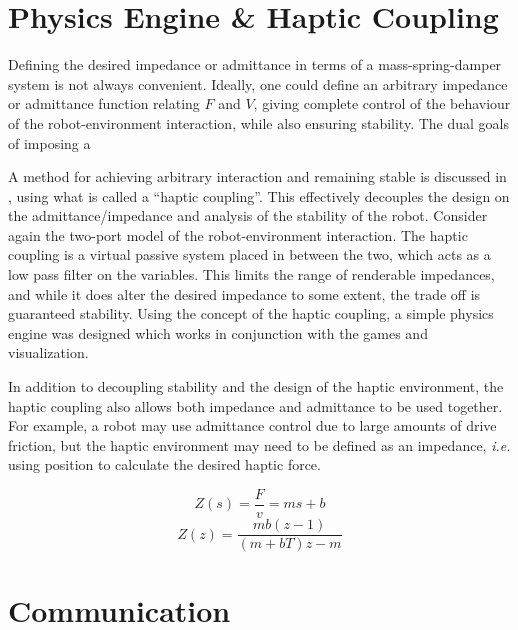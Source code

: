 \documentclass[12pt]{report}
\begin{document}
	

	\section{Physics Engine \& Haptic Coupling}
%

Defining the desired impedance or admittance in terms of a mass-spring-damper system is not always convenient. Ideally, one could define an arbitrary impedance or admittance function relating $F$ and $V$, giving complete control of the behaviour of the robot-environment interaction, while also ensuring stability. The dual goals of imposing a 
	
	A method for achieving arbitrary interaction and remaining stable is discussed in \cite{Adams1999}, using what is called a ``haptic coupling''. This effectively decouples the design on the admittance/impedance and analysis of the stability of the robot. Consider again the two-port model of the robot-environment interaction. The haptic coupling is a virtual passive system placed in between the two, which acts as a low pass filter on the variables. This limits the range of renderable impedances, and while it does alter the desired impedance to some extent, the trade off is guaranteed stability. Using the concept of the haptic coupling, a simple physics engine was designed which works in conjunction with the games and visualization. 
	
	In addition to decoupling stability and the design of the haptic environment, the haptic coupling also allows both impedance and admittance to be used together. For example, a robot may use admittance control due to large amounts of drive friction, but the haptic environment may need to be defined as an impedance, \textit{i.e.} using position to calculate the desired haptic force. 
	
	\begin{equation}
		Z(s) = \frac{F}{v} = ms + b  
	\end{equation}
	\begin{equation}
		Z(z) = \frac{mb(z-1)}{(m+bT)z - m}
	\end{equation}

	\section{Communication} 
%
\end{document}
